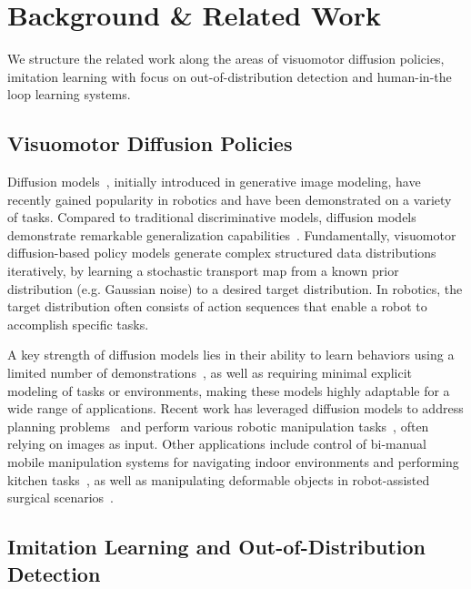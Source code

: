 \section{Background \& Related Work}
We structure the related work along the areas of visuomotor diffusion policies, imitation learning with focus on out-of-distribution detection and human-in-the loop learning systems.
\subsection{Visuomotor Diffusion Policies}

Diffusion models~\cite{ho2020denoising}, initially introduced in generative image modeling, have recently gained popularity in robotics and have been demonstrated on a variety of tasks. Compared to traditional discriminative models, diffusion models demonstrate remarkable generalization capabilities~\cite{li2023onthe}. Fundamentally, visuomotor diffusion-based policy models generate complex structured data distributions iteratively, by learning a stochastic transport map from a known prior distribution (e.g. Gaussian noise) to a desired target distribution. In robotics, the target distribution often consists of action sequences that enable a robot to accomplish specific tasks. 

A key strength of diffusion models lies in their ability to learn behaviors using a limited number of demonstrations~\cite{chi2023diffusion}, as well as requiring minimal explicit modeling of tasks or environments, making these models highly adaptable for a wide range of applications.  Recent work has leveraged diffusion models to address planning problems~\cite{kapelyukh2023dallebot, mishra2023generative, sridhar2024nomad} and perform various robotic manipulation tasks~\cite{mishra2024reorientdiff, chi2023diffusion, reuss2023goal}, often relying on images as input. Other applications include control of bi-manual mobile manipulation systems for navigating indoor environments and performing kitchen tasks~\cite{fu2024mobile}, as well as manipulating deformable objects in robot-assisted surgical scenarios~\cite{scheikl2024movement}.


\subsection{Imitation Learning and Out-of-Distribution Detection}

